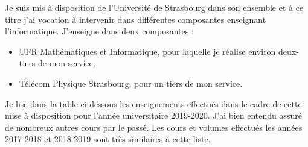 Je suis mis à  disposition de l'Université de Strasbourg dans  son ensemble et à
ce  titre j'ai  vocation à  intervenir dans  différentes composantes  enseignant
l'informatique. J'enseigne dans deux composantes :
\begin{itemize}
\item UFR Mathématiques et Informatique, pour laquelle je réalise environ
  deux-tiers de mon service,
\item Télécom Physique Strasbourg, pour un tiers de mon service.
\end{itemize}

\bigskip
Je lise dans  la table ci-dessous les enseignements effectués  dans le cadre de
cette mise à disposition pour l'année universitaire 2019-2020. J'ai bien entendu
assuré de  nombreux autres cours par  le passé.  Les cours  et volumes effectués
les années 2017-2018 et 2018-2019 sont très similaires à cette liste.

